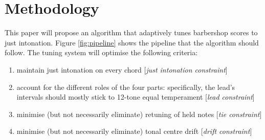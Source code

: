 \documentclass[a4paper]{article}
\begin{document}
\section{Methodology}
\label{methodoloy}
This paper will propose an algorithm that adaptively tunes barbershop scores to just intonation. Figure \ref{fig:pipeline} shows the pipeline that the algorithm should follow. The tuning system will optimise the following criteria:
\begin{enumerate}
	\item maintain just intonation on every chord [\textit{just intonation constraint}]
	\item account for the different roles of the four parts: specifically, the lead's intervals should mostly stick to 12-tone equal temperament [\textit{lead constraint}]
	\item minimise (but not necessarily eliminate) retuning of held notes [\textit{tie constraint}]
	\item minimise (but not necessarily eliminate) tonal centre drift [\textit{drift constraint}]
\end{enumerate}
\end{document}
